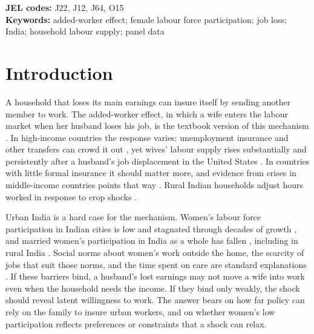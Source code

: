 \begin{abstract}
When an urban Indian husband stops working, does his wife start? I link couples across the urban rotational panel of the Periodic Labour Force Survey, pooling households first visited between July 2022 and June 2024 and joining revisits across files. Among wives outside the labour force, a husband's stop is associated with a 1.70 percentage point higher chance that she is in the labour force at the next visit (95\% CI $-0.56$ to 3.97), with no detectable rise in employment. The 2017--18 panel gives a similar estimate, and placebo tests detect no prior difference. Among working wives, a stop is associated with a 21.38 point higher chance that she also stops. Other members are more likely to start work. A layoff check is inconclusive, so these are associations. In the baseline specification, the estimates rule out a rise above about 4 points (about 5 to 6 allowing for attrition).
\end{abstract}

\noindent\textbf{JEL codes:} J22, J12, J64, O15\\
\noindent\textbf{Keywords:} added-worker effect; female labour force participation; job loss; India; household labour supply; panel data

\section{Introduction}

A household that loses its main earnings can insure itself by sending another member to work. The added-worker effect, in which a wife enters the labour market when her husband loses his job, is the textbook version of this mechanism \citep{lundberg1985}. In high-income countries the response varies: unemployment insurance and other transfers can crowd it out \citep{cullen2000,halla2020}, yet wives' labour supply rises substantially and persistently after a husband's job displacement in the United States \citep{stephens2002}. In countries with little formal insurance it should matter more, and evidence from crises in middle-income countries points that way \citep{skoufias2006,bhalotra2010}. Rural Indian households adjust hours worked in response to crop shocks \citep{kochar1999}.

Urban India is a hard case for the mechanism. Women's labour force participation in Indian cities is low and stagnated through decades of growth \citep{klasen2015}, and married women's participation in India as a whole has fallen \citep{mehrotra2017}, including in rural India \citep{afridi2018}. Social norms about women's work outside the home, the scarcity of jobs that suit those norms, and the time spent on care are standard explanations \citep{jayachandran2021}. If these barriers bind, a husband's lost earnings may not move a wife into work even when the household needs the income. If they bind only weakly, the shock should reveal latent willingness to work. The answer bears on how far policy can rely on the family to insure urban workers, and on whether women's low participation reflects preferences or constraints that a shock can relax.

